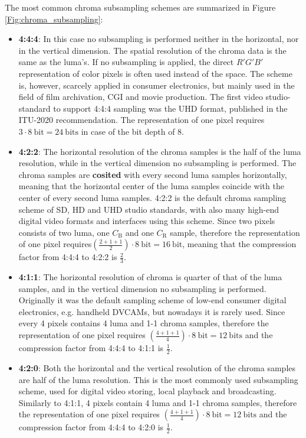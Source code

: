 The most common chroma subsampling schemes are summarized in Figure \ref{Fig:chroma_subsampling}:
\begin{itemize}
\item \textbf{4:4:4}: In this case no subsampling is performed neither in the horizontal, nor in the vertical dimension.
The spatial resolution of the chroma data is the same as the luma's.
If no subsampling is applied, the direct $R'G'B'$ representation of color pixels is often used instead of the \ycbcr space.
The scheme is, however, scarcely applied in consumer electronics, but mainly used in the field of film archivation, CGI and movie production.
The first video studio-standard to support 4:4:4 sampling was the UHD format, published in the ITU-2020 recommendation.
The representation of one pixel requires $3 \cdot 8 ~\mathrm{bit} = 24~\mathrm{bits}$ in case of the bit depth of 8.
%
\item \textbf{4:2:2}: The horizontal resolution of the chroma samples is the half of the luma resolution, while in the vertical dimension no subsampling is performed.
The chroma samples are \textbf{cosited} with every second luma samples horizontally, meaning that the horizontal center of the luma samples coincide with the center of every second luma samples.
4:2:2 is the default chroma sampling scheme of SD, HD and UHD studio standards, with also many high-end digital video formats and interfaces using this scheme.
Since two pixels consists of two luma, one $C_{\mathrm{B}}$ and one $C_{\mathrm{R}}$ sample, therefore the representation of one pixel requires$(\frac{2 + 1 + 1}{2})\cdot 8~\mathrm{bit} = 16~\mathrm{bit}$, meaning that the compression factor from 4:4:4 to 4:2:2 is $\frac{2}{3}$.
%
\item \textbf{4:1:1}: The horizontal resolution of chroma is quarter of that of the luma samples, and in the vertical dimension no subsampling is performed.
Originally it was the default sampling scheme of low-end consumer digital electronics, e.g. handheld DVCAMs, but nowadays it is rarely used.
Since every 4 pixels contains 4 luma and 1-1 chroma samples, therefore the representation of one pixel requires $( \frac{4 + 1 + 1}{4})\cdot 8~\mathrm{bit} = 12~\mathrm{bits}$ and the compression factor from 4:4:4 to 4:1:1 is $\frac{1}{2}$.
%
\item \textbf{4:2:0}: Both the horizontal and the vertical resolution of the chroma samples are half of the luma resolution.
This is the most commonly used subsampling scheme, used for digital video storing, local playback and broadcasting.
Similarly to 4:1:1, 4 pixels contain 4 luma and 1-1 chroma samples, therefore the representation of one pixel requires $( \frac{4 + 1 + 1}{4})\cdot 8~\mathrm{bit} = 12~\mathrm{bits}$ and the compression factor from 4:4:4 to 4:2:0 is $\frac{1}{2}$.


\end{itemize}
